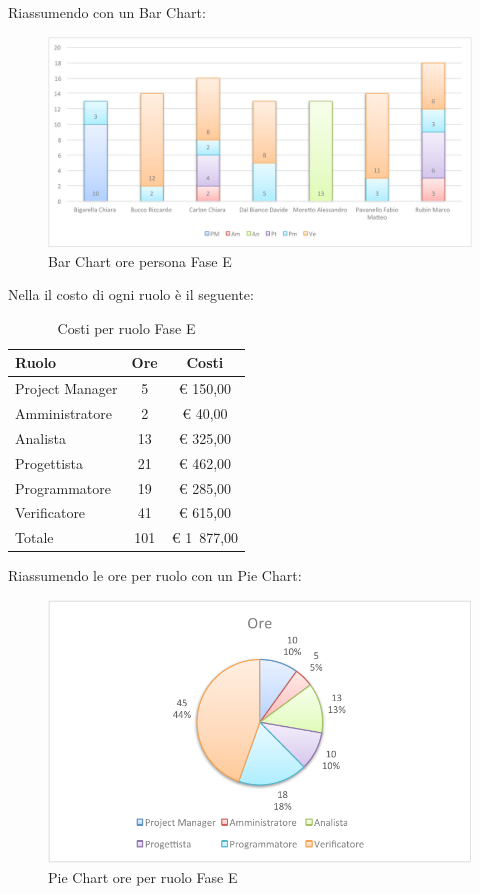 				Riassumendo con un Bar Chart:
				\begin{figure}[H]\centering
					\includegraphics[width=\textwidth]{PianoDiProgetto/Pics/ChartOreFaseE.pdf}
					\caption{Bar Chart ore persona Fase E}
				\end{figure}
				Nella  il costo di ogni ruolo è il seguente:
				\begin{table}[H]
					\begin{center}
						\begin{tabular}{| l | c | c |}
							\hline
							Ruolo 				& Ore 		& Costi  \\ \hline
							
							Project Manager		& 5 		& \euro{} 150,00 	\\
							Amministratore 		& 2 		& \euro{} 40,00 	\\
							Analista	 		& 13 		& \euro{} 325,00 	\\
							Progettista 		& 21 		& \euro{} 462,00  	\\
							Programmatore		& 19		& \euro{} 285,00 	\\
							Verificatore		& 41 		& \euro{} 615,00 	\\ \hline \hline
								
							Totale	 			& 101 		& \euro{} 1~877,00 	\\ \hline
						\end{tabular}
					\end{center}
					\caption{Costi per ruolo Fase E}
				\end{table}
				Riassumendo le ore per ruolo con un Pie Chart:
				\begin{figure}[H]\centering
					\includegraphics[width=\textwidth]{PianoDiProgetto/Pics/ChartTotOreFaseE.pdf}
					\caption{Pie Chart ore per ruolo Fase E}
				\end{figure}
